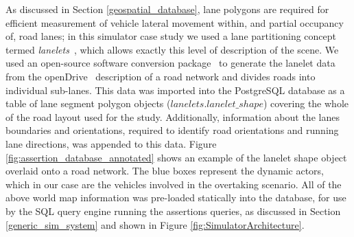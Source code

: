 
As discussed in Section \ref{geospatial_database}, lane polygons are required for efficient measurement of vehicle lateral movement within, and partial occupancy of, road lanes; in this simulator case study we used a lane partitioning concept termed \textit{lanelets}~\cite{lanelets2014}, which allows exactly this level of description of the scene. We used an open-source software conversion package~\cite{lanelets_to_openDrive} to generate the lanelet data from the openDrive~\cite{opendrive} description of a road network and divides roads into individual sub-lanes. This data was imported into the PostgreSQL database as a table of lane segment polygon objects ($lanelets.lanelet\_shape$) covering the whole of the road layout used for the study. Additionally, information about the lanes boundaries and orientations, required to identify road orientations and running lane directions, was appended to this data. 
%
Figure \ref{fig:assertion_database_annotated} shows an example of the lanelet shape object overlaid onto a road network. The blue boxes represent the dynamic actors, which in our case are the vehicles involved in the overtaking scenario. 
%
All of the above world map information was pre-loaded statically into the database, for use by the SQL query engine running the assertions queries, as discussed in Section \ref{generic_sim_system} and shown in Figure \ref{fig:SimulatorArchitecture}.

